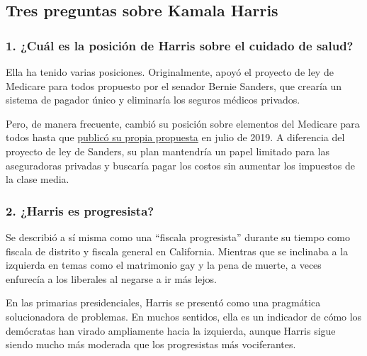 \hypertarget{tres-preguntas-sobre-kamala-harris}{%
\subsection{Tres preguntas sobre Kamala
Harris}\label{tres-preguntas-sobre-kamala-harris}}

\hypertarget{1-cuuxe1l-es-la-posiciuxf3n-de-harris-sobre-el-cuidado-de-salud}{%
\subsubsection{\texorpdfstring{\textbf{1. ¿Cuál es la posición de Harris
sobre el cuidado de
salud?}}{1. ¿Cuál es la posición de Harris sobre el cuidado de salud?}}\label{1-cuuxe1l-es-la-posiciuxf3n-de-harris-sobre-el-cuidado-de-salud}}

Ella ha tenido varias posiciones. Originalmente, apoyó el proyecto de
ley de Medicare para todos propuesto por el senador Bernie Sanders, que
crearía un sistema de pagador único y eliminaría los seguros médicos
privados.

Pero, de manera frecuente, cambió su posición sobre elementos del
Medicare para todos hasta que
\href{https://www.nytimes3xbfgragh.onion/2019/07/29/us/politics/kamala-harris-medicare-for-all.html}{publicó
su propia propuesta} en julio de 2019. A diferencia del proyecto de ley
de Sanders, su plan mantendría un papel limitado para las aseguradoras
privadas y buscaría pagar los costos sin aumentar los impuestos de la
clase media.

\hypertarget{2-harris-es-progresista}{%
\subsubsection{\texorpdfstring{\textbf{2. ¿Harris es
progresista?}}{2. ¿Harris es progresista?}}\label{2-harris-es-progresista}}

Se describió a sí misma como una ``fiscala progresista'' durante su
tiempo como fiscala de distrito y fiscala general en California.
Mientras que se inclinaba a la izquierda en temas como el matrimonio gay
y la pena de muerte, a veces enfurecía a los liberales al negarse a ir
más lejos.

En las primarias presidenciales, Harris se presentó como una pragmática
solucionadora de problemas. En muchos sentidos, ella es un indicador de
cómo los demócratas han virado ampliamente hacia la izquierda, aunque
Harris sigue siendo mucho más moderada que los progresistas más
vociferantes.

